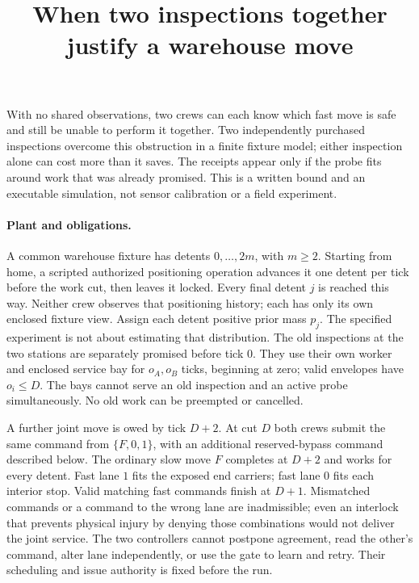 \documentclass[11pt]{article}
\title{When two inspections together justify a warehouse move}
\date{}
\begin{document}
\maketitle

With no shared observations, two crews can each know which fast move is safe and still be unable to perform it together. Two independently purchased inspections overcome this obstruction in a finite fixture model; either inspection alone can cost more than it saves. The receipts appear only if the probe fits around work that was already promised. This is a written bound and an executable simulation, not sensor calibration or a field experiment.

\paragraph{Plant and obligations.}
A common warehouse fixture has detents $0,\ldots,2m$, with $m\ge2$. Starting from home, a scripted authorized positioning operation advances it one detent per tick before the work cut, then leaves it locked. Every final detent $j$ is reached this way. Neither crew observes that positioning history; each has only its own enclosed fixture view. Assign each detent positive prior mass $p_j$. The specified experiment is not about estimating that distribution. The old inspections at the two stations are separately promised before tick $0$. They use their own worker and enclosed service bay for $o_A,o_B$ ticks, beginning at zero; valid envelopes have $o_i\le D$. The bays cannot serve an old inspection and an active probe simultaneously. No old work can be preempted or cancelled.

A further joint move is owed by tick $D+2$. At cut $D$ both crews submit the same command from $\{F,0,1\}$, with an additional reserved-bypass command described below. The ordinary slow move $F$ completes at $D+2$ and works for every detent. Fast lane $1$ fits the exposed end carriers; fast lane $0$ fits each interior stop. Valid matching fast commands finish at $D+1$. Mismatched commands or a command to the wrong lane are inadmissible; even an interlock that prevents physical injury by denying those combinations would not deliver the joint service. The two controllers cannot postpone agreement, read the other's command, alter lane independently, or use the gate to learn and retry. Their scheduling and issue authority is fixed before the run.
\end{document}
